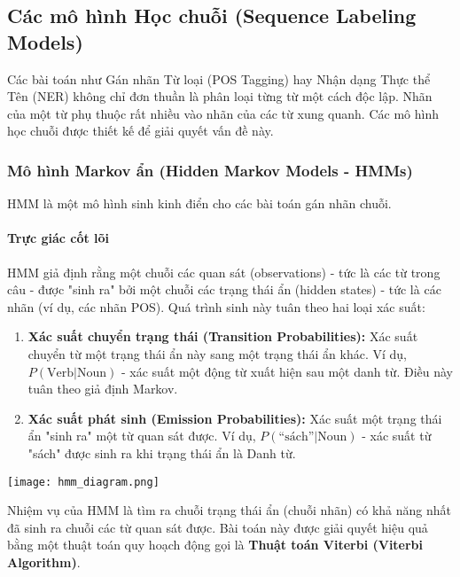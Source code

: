 \subsection{Các mô hình Học chuỗi (Sequence Labeling Models)}
\label{ssec:sequence_models}
Các bài toán như Gán nhãn Từ loại (POS Tagging) hay Nhận dạng Thực thể Tên (NER) không chỉ đơn thuần là phân loại từng từ một cách độc lập. Nhãn của một từ phụ thuộc rất nhiều vào nhãn của các từ xung quanh. Các mô hình học chuỗi được thiết kế để giải quyết vấn đề này.

\subsubsection{Mô hình Markov ẩn (Hidden Markov Models - HMMs)}
HMM \cite{rabiner1989tutorial} là một mô hình sinh kinh điển cho các bài toán gán nhãn chuỗi.

\paragraph{Trực giác cốt lõi}
HMM giả định rằng một chuỗi các quan sát (observations) - tức là các từ trong câu - được "sinh ra" bởi một chuỗi các trạng thái ẩn (hidden states) - tức là các nhãn (ví dụ, các nhãn POS).
Quá trình sinh này tuân theo hai loại xác suất:
\begin{enumerate}
    \item \textbf{Xác suất chuyển trạng thái (Transition Probabilities):} Xác suất chuyển từ một trạng thái ẩn này sang một trạng thái ẩn khác. Ví dụ, $P(\text{Verb}|\text{Noun})$ - xác suất một động từ xuất hiện sau một danh từ. Điều này tuân theo giả định Markov.
    \item \textbf{Xác suất phát sinh (Emission Probabilities):} Xác suất một trạng thái ẩn "sinh ra" một từ quan sát được. Ví dụ, $P(\text{``sách''}|\text{Noun})$ - xác suất từ "sách" được sinh ra khi trạng thái ẩn là Danh từ.
\end{enumerate}

\begin{center}
    \texttt{[image: hmm\_diagram.png]}
    \label{fig:hmm_diagram}
\end{center}

Nhiệm vụ của HMM là tìm ra chuỗi trạng thái ẩn (chuỗi nhãn) có khả năng nhất đã sinh ra chuỗi các từ quan sát được. Bài toán này được giải quyết hiệu quả bằng một thuật toán quy hoạch động gọi là \textbf{Thuật toán Viterbi (Viterbi Algorithm)}.

